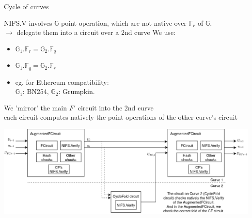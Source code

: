 \documentclass[t]{beamer} \usefonttheme[onlymath]{serif}
\begin{document}
\begin{frame}{Cycle of curves}
  \scriptsize{
    NIFS.V involves $\mathbb{G}$ point operation, which are not native over $\mathbb{F}_r$ of $\mathbb{G}$.
  \\$\longrightarrow$ delegate them into a circuit over a 2nd curve 
  We use:
  \begin{itemize}
    \item $\mathbb{G}_1.\mathbb{F}_r = \mathbb{G}_2.\mathbb{F}_q$
    \item $\mathbb{G}_1.\mathbb{F}_q = \mathbb{G}_2.\mathbb{F}_r$
    \item eg. for Ethereum compatibility:\\
      $\mathbb{G}_1$: BN254, $\mathbb{G}_2$: Grumpkin.
  \end{itemize}

  We 'mirror' the main $F'$ circuit into the 2nd curve\\
  each circuit computes natively the point operations of the other curve's circuit
  }
  \vspace{0.3cm}

  \includegraphics[width=\textwidth]{nova-cycle-of-curves-cyclefold}
\end{frame}
\end{document}
